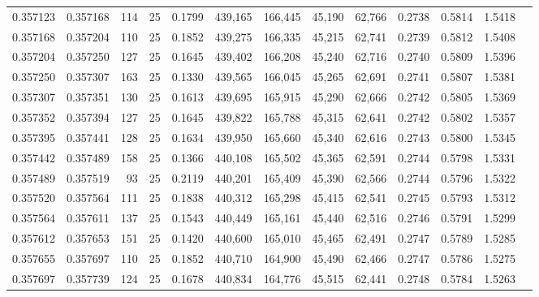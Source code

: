 \begin{tabular}{rrrrrrrrrrrrr}
0.357123 & 0.357168 &   114 &  25 &                                     0.1799 & 439,165 & 166,445 &  45,190 &  62,766 & 0.2738 & 0.5814 & 1.5418 \\
0.357168 & 0.357204 &   110 &  25 &                                     0.1852 & 439,275 & 166,335 &  45,215 &  62,741 & 0.2739 & 0.5812 & 1.5408 \\
0.357204 & 0.357250 &   127 &  25 &                                     0.1645 & 439,402 & 166,208 &  45,240 &  62,716 & 0.2740 & 0.5809 & 1.5396 \\
0.357250 & 0.357307 &   163 &  25 &                                     0.1330 & 439,565 & 166,045 &  45,265 &  62,691 & 0.2741 & 0.5807 & 1.5381 \\
0.357307 & 0.357351 &   130 &  25 &                                     0.1613 & 439,695 & 165,915 &  45,290 &  62,666 & 0.2742 & 0.5805 & 1.5369 \\
0.357352 & 0.357394 &   127 &  25 &                                     0.1645 & 439,822 & 165,788 &  45,315 &  62,641 & 0.2742 & 0.5802 & 1.5357 \\
0.357395 & 0.357441 &   128 &  25 &                                     0.1634 & 439,950 & 165,660 &  45,340 &  62,616 & 0.2743 & 0.5800 & 1.5345 \\
0.357442 & 0.357489 &   158 &  25 &                                     0.1366 & 440,108 & 165,502 &  45,365 &  62,591 & 0.2744 & 0.5798 & 1.5331 \\
0.357489 & 0.357519 &    93 &  25 &                                     0.2119 & 440,201 & 165,409 &  45,390 &  62,566 & 0.2744 & 0.5796 & 1.5322 \\
0.357520 & 0.357564 &   111 &  25 &                                     0.1838 & 440,312 & 165,298 &  45,415 &  62,541 & 0.2745 & 0.5793 & 1.5312 \\
0.357564 & 0.357611 &   137 &  25 &                                     0.1543 & 440,449 & 165,161 &  45,440 &  62,516 & 0.2746 & 0.5791 & 1.5299 \\
0.357612 & 0.357653 &   151 &  25 &                                     0.1420 & 440,600 & 165,010 &  45,465 &  62,491 & 0.2747 & 0.5789 & 1.5285 \\
0.357655 & 0.357697 &   110 &  25 &                                     0.1852 & 440,710 & 164,900 &  45,490 &  62,466 & 0.2747 & 0.5786 & 1.5275 \\
0.357697 & 0.357739 &   124 &  25 &                                     0.1678 & 440,834 & 164,776 &  45,515 &  62,441 & 0.2748 & 0.5784 & 1.5263 \\

\end{tabular}
